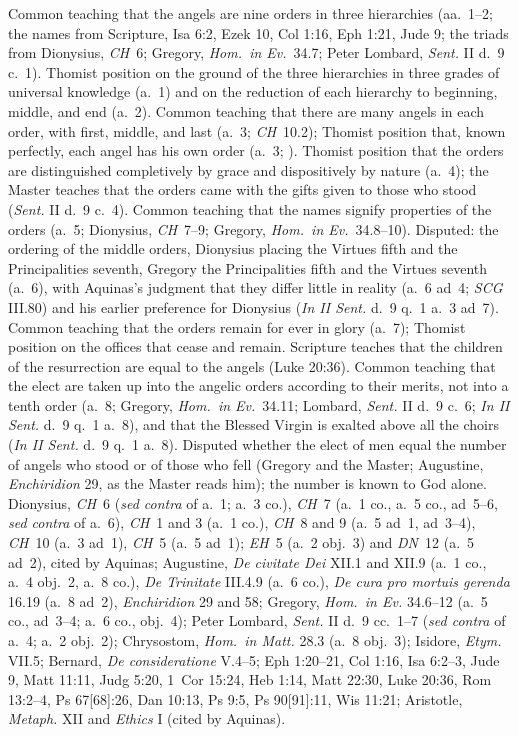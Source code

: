  {Common teaching that the angels are nine orders in three hierarchies
 (aa.~1--2; the names from Scripture, Isa 6:2, Ezek 10, Col 1:16, Eph 1:21,
 Jude 9; the triads from Dionysius, \emph{CH}~6; Gregory, \emph{Hom.\ in Ev.}\ 34.7;
 Peter Lombard, \emph{Sent.} II d.~9 c.~1). Thomist position on the ground
 of the three hierarchies in three grades of universal knowledge (a.~1) and
 on the reduction of each hierarchy to beginning, middle, and end (a.~2).
 Common teaching that there are many angels in each order, with first,
 middle, and last (a.~3; \emph{CH}~10.2); Thomist position that, known
 perfectly, each angel has his own order (a.~3; ). Thomist
 position that the orders are distinguished completively by grace and
 dispositively by nature (a.~4); the Master teaches that the orders came
 with the gifts given to those who stood (\emph{Sent.} II d.~9 c.~4). Common
 teaching that the names signify properties of the orders (a.~5; Dionysius,
 \emph{CH}~7--9; Gregory, \emph{Hom.\ in Ev.}\ 34.8--10). Disputed: the ordering of
 the middle orders, Dionysius placing the Virtues fifth and the
 Principalities seventh, Gregory the Principalities fifth and the Virtues
 seventh (a.~6), with Aquinas's judgment that they differ little in reality
 (a.~6 ad~4; \emph{SCG} III.80) and his earlier preference for Dionysius
 (\emph{In II Sent.} d.~9 q.~1 a.~3 ad~7). Common teaching that the orders
 remain for ever in glory (a.~7); Thomist position on the offices that
 cease and remain. Scripture teaches that the children of the resurrection
 are equal to the angels (Luke 20:36). Common teaching that the elect are
 taken up into the angelic orders according to their merits, not into a
 tenth order (a.~8; Gregory, \emph{Hom.\ in Ev.}\ 34.11; Lombard, \emph{Sent.} II
 d.~9 c.~6; \emph{In II Sent.} d.~9 q.~1 a.~8), and that the Blessed Virgin
 is exalted above all the choirs (\emph{In II Sent.} d.~9 q.~1 a.~8).
 Disputed whether the elect of men equal the number of angels who stood or
 of those who fell (Gregory and the Master; Augustine, \emph{Enchiridion}
 29, as the Master reads him); the number is known to God alone.}
 {Dionysius, \emph{CH}~6 (\emph{sed contra} of a.~1; a.~3 co.), \emph{CH}~7
 (a.~1 co., a.~5 co., ad~5--6, \emph{sed contra} of a.~6), \emph{CH}~1 and 3
 (a.~1 co.), \emph{CH}~8 and 9 (a.~5 ad~1, ad~3--4), \emph{CH}~10 (a.~3
 ad~1), \emph{CH}~5 (a.~5 ad~1); \emph{EH}~5 (a.~2 obj.~3) and \emph{DN}~12 (a.~5 ad~2), cited by Aquinas; Augustine,
 \emph{De civitate Dei} XII.1 and XII.9 (a.~1 co., a.~4 obj.~2, a.~8 co.),
 \emph{De Trinitate} III.4.9 (a.~6 co.), \emph{De cura pro mortuis gerenda}
 16.19 (a.~8 ad~2), \emph{Enchiridion} 29 and 58;
 Gregory, \emph{Hom.\ in Ev.} 34.6--12 (a.~5 co., ad~3--4; a.~6 co.,
 obj.~4); Peter Lombard, \emph{Sent.} II d.~9 cc.~1--7 (\emph{sed contra} of
 a.~4; a.~2 obj.~2); Chrysostom, \emph{Hom.\ in Matt.} 28.3 (a.~8 obj.~3);
 Isidore, \emph{Etym.} VII.5; Bernard, \emph{De consideratione} V.4--5;
 Eph 1:20--21, Col 1:16, Isa 6:2--3, Jude 9, Matt 11:11, Judg 5:20, 1~Cor
 15:24, Heb 1:14, Matt 22:30, Luke 20:36, Rom 13:2--4, Ps 67[68]:26, Dan 10:13,
 Ps 9:5, Ps 90[91]:11, Wis 11:21; Aristotle, \emph{Metaph.} XII and
 \emph{Ethics} I (cited by Aquinas).}
